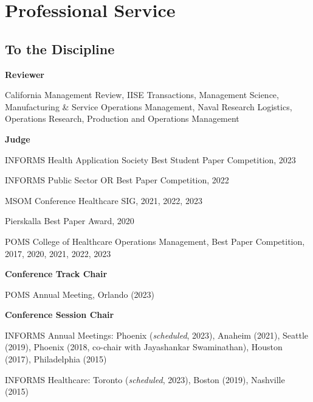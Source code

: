 \documentclass[11pt,a4paper]{article}
\renewenvironment{itemize}{
	\begin{list}{}{
			\setlength{\leftmargin}{1.5em}
		}
	}{
\end{list}
}
\begin{document}
	\section*{\textbf{Professional Service}}
	\subsection*{To the Discipline}
	\begin{itemize}
		\item \textbf{Reviewer}
		\begin{itemize}

			\item California Management Review, IISE Transactions,  Management Science, Manufacturing \& Service Operations Management, Naval Research Logistics, Operations Research, Production and Operations Management %


		\end{itemize}
		\item \textbf{Judge}
		\begin{itemize}
				\item INFORMS Health Application Society Best Student Paper Competition, 2023
			\item INFORMS Public Sector OR Best Paper Competition, 2022
			\item MSOM Conference Healthcare SIG, 2021, 2022, 2023
			\item Pierskalla Best Paper Award, 2020
			\item POMS College of Healthcare Operations Management, Best Paper Competition, 2017, 2020, 2021, 2022, 2023
		\end{itemize}
		\item \textbf{Conference Track Chair}
	\begin{itemize}
		\item POMS Annual Meeting, Orlando (2023)
	\end{itemize}
		\item \textbf{Conference Session Chair}
		\begin{itemize}
			\item  INFORMS Annual Meetings: Phoenix (\emph{scheduled}, 2023), Anaheim (2021), Seattle (2019), Phoenix (2018, co-chair with Jayashankar  Swaminathan), Houston (2017), Philadelphia (2015)
			\item INFORMS Healthcare: Toronto (\emph{scheduled}, 2023), Boston (2019), Nashville (2015)
			\end{itemize}

	\end{itemize}
\end{document}
